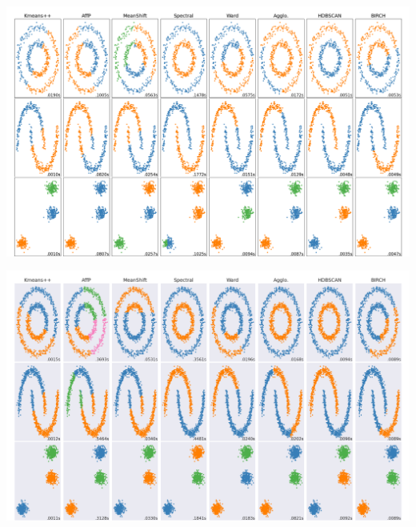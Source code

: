 \documentclass[12pt]{article}
\begin{document}
	\begin{center}
		\begin{minipage}{\linewidth}
			\includegraphics[width=\linewidth]{../clustering_result_500}
		\end{minipage}%
		\hfill
		\begin{minipage}{\linewidth}
			\includegraphics[width=\linewidth]{../clustering_result_1000}
		\end{minipage}
	\end{center}
\end{document}
